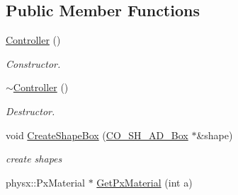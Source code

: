 \subsection*{Public Member Functions}
\begin{DoxyCompactItemize}
\item 
\hypertarget{classContent_1_1Actor_1_1Physics_1_1PhysX_1_1Controller_a80c81344bcb4855cbd5662c2ddd40730}{
\hyperlink{classContent_1_1Actor_1_1Physics_1_1PhysX_1_1Controller_a80c81344bcb4855cbd5662c2ddd40730}{Controller} ()}
\label{classContent_1_1Actor_1_1Physics_1_1PhysX_1_1Controller_a80c81344bcb4855cbd5662c2ddd40730}

\begin{DoxyCompactList}\small\item\em Constructor. \item\end{DoxyCompactList}\item 
\hypertarget{classContent_1_1Actor_1_1Physics_1_1PhysX_1_1Controller_a1b876b197a8698624c11482470867b22}{
\hyperlink{classContent_1_1Actor_1_1Physics_1_1PhysX_1_1Controller_a1b876b197a8698624c11482470867b22}{$\sim$Controller} ()}
\label{classContent_1_1Actor_1_1Physics_1_1PhysX_1_1Controller_a1b876b197a8698624c11482470867b22}

\begin{DoxyCompactList}\small\item\em Destructor. \item\end{DoxyCompactList}\item 
\hypertarget{classContent_1_1Actor_1_1Physics_1_1PhysX_1_1Controller_a906a3252cf01c6b1b5d9c688b04cb846}{
void \hyperlink{classContent_1_1Actor_1_1Physics_1_1PhysX_1_1Controller_a906a3252cf01c6b1b5d9c688b04cb846}{CreateShapeBox} (\hyperlink{classContent_1_1Shape_1_1Admin_1_1Box}{CO\_\-SH\_\-AD\_\-Box} $\ast$\&shape)}
\label{classContent_1_1Actor_1_1Physics_1_1PhysX_1_1Controller_a906a3252cf01c6b1b5d9c688b04cb846}

\begin{DoxyCompactList}\small\item\em create shapes \item\end{DoxyCompactList}\item 
\hypertarget{classContent_1_1Actor_1_1Physics_1_1PhysX_1_1Controller_abb8bf66a51ccea23c74809c26feb128a}{
physx::PxMaterial $\ast$ \hyperlink{classContent_1_1Actor_1_1Physics_1_1PhysX_1_1Controller_abb8bf66a51ccea23c74809c26feb128a}{GetPxMaterial} (int a)}
\label{classContent_1_1Actor_1_1Physics_1_1PhysX_1_1Controller_abb8bf66a51ccea23c74809c26feb128a}


\end{DoxyCompactItemize}
